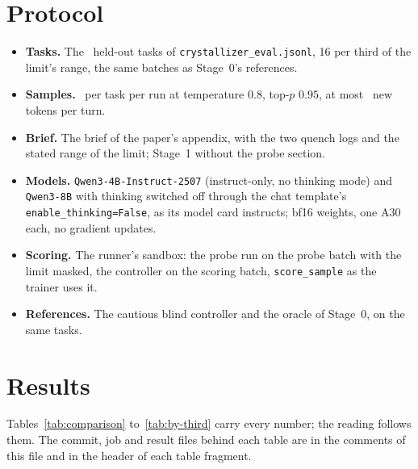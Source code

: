 \documentclass[11pt,a4paper]{article}
\begin{document}
\section{Protocol}

\begin{itemize}[leftmargin=1.5em]
  \item \textbf{Tasks.} The \SFntasks\ held-out tasks of
  \texttt{crystallizer\_eval.jsonl}, 16 per third of the limit's range, the
  same batches as Stage~0's references.
  \item \textbf{Samples.} \SFnsamples\ per task per run at temperature $0.8$,
  top-$p$ $0.95$, at most \SFmaxtokens\ new tokens per turn.
  \item \textbf{Brief.} The brief of the paper's appendix, with the two quench
  logs and the stated range of the limit; Stage~1 without the probe section.
  \item \textbf{Models.} \texttt{Qwen3-4B-Instruct-2507} (instruct-only, no
  thinking mode) and \texttt{Qwen3-8B} with thinking switched off through the
  chat template's \texttt{enable\_thinking=False}, as its model card
  instructs; bf16 weights, one A30 each, no gradient updates.
  \item \textbf{Scoring.} The runner's sandbox: the probe run on the probe
  batch with the limit masked, the controller on the scoring batch,
  \texttt{score\_sample} as the trainer uses it.
  \item \textbf{References.} The cautious blind controller and the oracle of
  Stage~0, on the same tasks.
\end{itemize}

\section{Results}

Tables~\ref{tab:comparison} to~\ref{tab:by-third} carry every number; the
reading follows them. The commit, job and result files behind each table are
in the comments of this file and in the header of each table fragment.

\begin{table}[h]
\centering\small
\resizebox{\linewidth}{!}{}
\caption{The four runs on the held-out tasks, next to the Stage~0 references.
Ride ratio, probe rate and estimate error are means over the samples that
have them.}
\label{tab:comparison}
\end{table}
\end{document}
